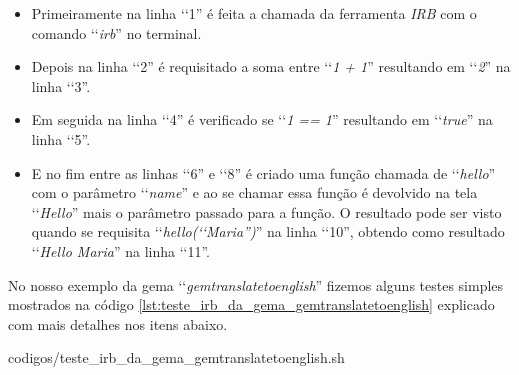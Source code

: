 \begin{itemize}


  \item Primeiramente na linha ‘‘1'' é feita a chamada da ferramenta \emph{IRB} com o comando ‘‘\emph{irb}''
  no terminal.

 \item Depois na linha ‘‘2'' é requisitado a soma entre ‘‘\emph{1 + 1}'' resultando em ‘‘\emph{2}'' na linha
 ‘‘3''.

 \item Em seguida na linha ‘‘4'' é verificado se ‘‘\emph{1 == 1}'' resultando em ‘‘\emph{true}'' na linha
 ‘‘5''.

 \item E no fim entre as linhas ‘‘6'' e ‘‘8'' é criado uma função chamada de ‘‘\emph{hello}'' com o
 parâmetro ‘‘\emph{name}'' e ao se chamar essa função é devolvido na tela ‘‘\emph{Hello}'' mais o
 parâmetro passado para a função. O resultado pode ser visto quando se requisita
 ‘‘\emph{hello(‘‘Maria'')}'' na linha ‘‘10'', obtendo como resultado ‘‘\emph{Hello Maria}'' na linha ‘‘11''.

\end{itemize}

No nosso exemplo da gema ‘‘\emph{gemtranslatetoenglish}'' fizemos alguns testes simples mostrados
na código \ref{lst:teste_irb_da_gema_gemtranslatetoenglish} explicado com mais detalhes nos itens abaixo.



{codigos/teste_irb_da_gema_gemtranslatetoenglish.sh}

